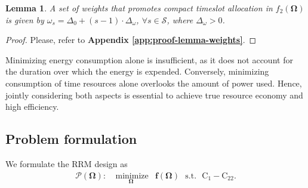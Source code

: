 \documentclass[10pt,journal,compsoc]{IEEEtran}
\newtheorem{lemma}[theorem]{Lemma}
\theoremstyle{myremark}
\theoremstyle{myexample}
\begin{document}
%


 

\begin{lemma} \label{lem:lemma-weights}
	A set of weights that promotes compact timeslot allocation in $ f_2 \left( \boldsymbol{\Omega} \right) $ is given by $ {\omega}_{s} = \Delta_0 + (s-1) \cdot \Delta_\omega $, $ \forall s \in \mathcal{S} $, where $ \Delta_\omega > 0 $.
\end{lemma}
\begin{proof}
Please, refer to \textbf{Appendix \ref{app:proof-lemma-weights}}.
\end{proof}
 
Minimizing energy consumption alone is insufficient, as it does not account for the duration over which the energy is expended. Conversely, minimizing consumption of time resources alone overlooks the amount of power used. Hence, jointly considering both aspects is essential to achieve true resource economy and high efficiency.



\subsection{Problem formulation}
We formulate the \gls{RRM} design as
\begin{align*} 
	\mathcal{P} \left( \boldsymbol{\Omega} \right): & \underset{ \boldsymbol{\Omega} }{\mathrm{~minimize}}
	& \mathbf{f} \left( \boldsymbol{\Omega} \right) ~~~ \mathrm{s.t.} ~~~ {\mathrm{C}}_{1} - {\mathrm{C}}_{22}.
\end{align*}
\end{document}
